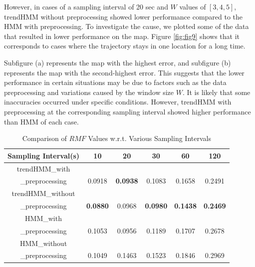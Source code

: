 \documentclass[preprint,12pt]{elsarticle}
\begin{document}
However, in cases of a sampling interval of 20 sec and $W$ values of $[3, 4, 5]$, trendHMM without preprocessing showed lower performance compared to the HMM with preprocessing. To investigate the cause, we plotted some of the data that resulted in lower performance on the map. Figure \ref{fig:fig9} shows that it corresponds to cases where the trajectory stays in one location for a long time. 

	Subfigure (a) represents the map with the highest error, and subfigure (b) represents the map with the second-highest error. This suggests that the lower performance in certain situations may be due to factors such as the data preprocessing %
 and variations caused by the window size $W$. It is likely that some inaccuracies occurred under specific conditions. However, trendHMM with preprocessing at the corresponding sampling interval showed higher performance than HMM of each case.
\begin{table}
	\centering
	\begin{tabular}{|c|c c c c c|}
		\hline
		\textbf{Sampling Interval(s)} & \textbf{10} & \textbf{20} & \textbf{30} & \textbf{60} & \textbf{120} \\ 
		\hline\hline
		trendHMM\_with&  & & & & \\ \_preprocessing & {0.0918} & \textbf{0.0938} & {0.1083} & {0.1658} & {0.2491} \\ 
		\hline
		trendHMM\_without&  & & & & \\ \_preprocessing & \textbf{0.0880} & {0.0968} & \textbf{0.0980} & \textbf{0.1438}  & \textbf{0.2469} \\ 
		\hline
		HMM\_with&  & & & & \\ 
		\_preprocessing & {0.1053} & {0.0956} & {0.1189} & {0.1707}  & {0.2678} \\ 
		\hline
		HMM\_without&  & & & & \\ \_preprocessing & {0.1049} & {0.1463} & {0.1523} & {0.1846}  & {0.2969} \\ 
		\hline
	\end{tabular}
	\caption{Comparison of $RMF$ Values w.r.t. Various Sampling Intervals}
	\label{table:tab1}
\end{table}
\end{document}
